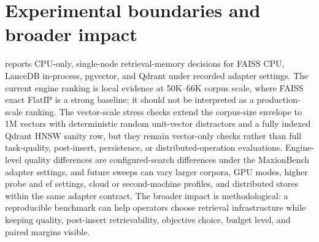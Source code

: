 \section{Experimental boundaries and broader impact}

\sys reports CPU-only, single-node retrieval-memory decisions for FAISS CPU, LanceDB in-process, pgvector, and Qdrant under recorded adapter settings. The current engine ranking is local evidence at 50K--66K corpus scale, where FAISS exact FlatIP is a strong baseline; it should not be interpreted as a production-scale ranking. The vector-scale stress checks extend the corpus-size envelope to 1M vectors with deterministic random unit-vector distractors and a fully indexed Qdrant HNSW sanity row, but they remain vector-only checks rather than full task-quality, post-insert, persistence, or distributed-operation evaluations. Engine-level quality differences are configured-search differences under the MaxionBench adapter settings, and future sweeps can vary larger corpora, GPU modes, higher probe and ef settings, cloud or second-machine profiles, and distributed stores within the same adapter contract. The broader impact is methodological: a reproducible benchmark can help operators choose retrieval infrastructure while keeping quality, post-insert retrievability, objective choice, budget level, and paired margins visible.
